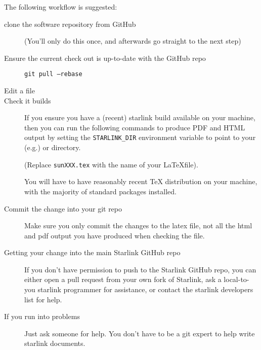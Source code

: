 \documentclass[twoside,11pt,nolof]{starlink}
\begin{document}
The following workflow is suggested:
\begin{description}
\item[clone the software repository from GitHub]
  (You'll only do this once, and afterwards go straight to the next step)

\item[Ensure the current check out is up-to-date with the GitHub repo]
  \texttt{git pull --rebase}

\item[Edit a file]

\item[Check it builds] If you ensure you have a (recent) starlink
  build available on your machine, then you can run the following
  commands to produce PDF and HTML output by setting the
  \texttt{STARLINK\_DIR} environment variable to point to your (e.g.)
   or  directory.

  (Replace \texttt{sunXXX.tex} with the name of your \LaTeX file).

   You will have to have reasonably recent TeX distribution on your
   machine, with the majority of standard packages installed.

 \item[Commit the change into your git repo] Make sure you only commit
   the changes to the latex file, not all the html and pdf output you
   have produced when checking the file.

\item[Getting your change into the main Starlink GitHub repo] If you
  don't have permission to push to the Starlink GitHub repo, you can
  either open a pull request from your own fork of Starlink, ask a
  local-to-you starlink programmer for assistance, or contact the
  starlink developers list for help.

\item[If you run into problems] Just ask someone for help. You don't
  have to be a git expert to help write starlink documents.

\end{description}
\end{document}
